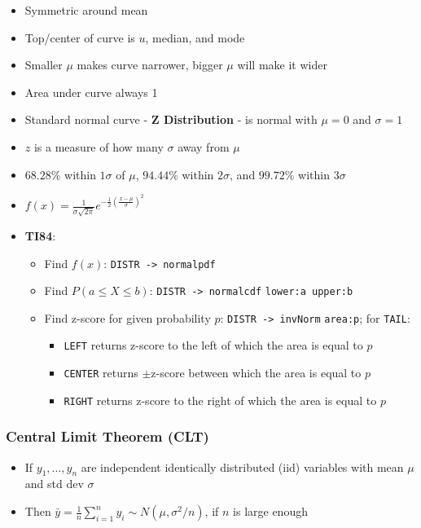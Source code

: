 \documentclass{article}
\newcommand{\code}[1]{\colorbox{light-gray}{\texttt{#1}}}
\begin{document}
\begin{itemize}
    \item Symmetric around mean
    \item Top/center of curve is $u$, median, and mode
    \item Smaller $\mu$ makes curve narrower, bigger $\mu$ will make it wider
    \item Area under curve always 1
    \item Standard normal curve - \textbf{Z Distribution} - is normal with $\mu=0$ and $\sigma=1$
    \item $z$ is a measure of how many $\sigma$ away from $\mu$
    \item $68.28\%$ within $1\sigma$ of $\mu$, $94.44\%$ within $2\sigma$, and $99.72\%$ within $3\sigma$
    \item $f(x)=\frac{1}{\sigma \sqrt{2\pi}}e^{-\frac{1}{2}(\frac{x-\mu}{\sigma})^2}$
    \item \textbf{TI84}:
    \begin{itemize}
        \item Find $f(x)$: \code{DISTR -> normalpdf}
        \item Find $P(a\leq X\leq b)$: \code{DISTR -> normalcdf} \code{lower:a upper:b}
        \item Find z-score for given probability $p$: \code{DISTR -> invNorm} \code{area:p}; for \code{TAIL}:
        \begin{itemize}
            \item \code{LEFT} returns z-score to the left of which the area is equal to $p$
            \item \code{CENTER} returns $\pm$z-score between which the area is equal to $p$
            \item \code{RIGHT} returns z-score to the right of which the area is equal to $p$
        \end{itemize}
    \end{itemize}
\end{itemize}

\subsubsection{Central Limit Theorem (CLT)}

\begin{itemize}
    \item If $y_1,\dots,y_n$ are independent identically distributed (iid) variables with mean $\mu$ and std dev $\sigma$
    \item Then $\bar{y}=\frac{1}{n}\sum_{i=1}^{n}y_i \sim N(\mu, \sigma^2 /n)$, if $n$ is large enough
\end{itemize}
\end{document}
